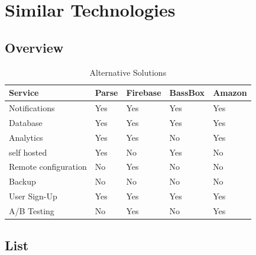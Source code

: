 
\section{Similar Technologies}

\subsection{Overview}

\begin{table}[h]
\centering
\caption{Alternative Solutions}
\label{fig:overview}
\begin{tabular}{|l|l|l|l|l|}
\hline
\cellcolor{green!20}Service &\cellcolor{green!20}Parse &\cellcolor{green!20}Firebase &\cellcolor{green!20}BassBox &\cellcolor{green!20}Amazon \\ \hline
Notifications               & Yes                      & Yes                         & Yes                        & Yes\\ \hline
Database                    & Yes                      & Yes                         & Yes                        & Yes\\ \hline
Analytics                   & Yes                      & Yes                         & No                         & Yes\\ \hline
self hosted                 & Yes                      & No                          & Yes                        & No \\ \hline
Remote configuration        & No                       & Yes                         & No                         & No \\ \hline
Backup                      & No                       & No                          & No                         & No \\ \hline
User Sign-Up                & Yes                      & Yes                         & Yes                        & Yes\\ \hline
A/B Testing                 & No                       & Yes                         & No                         & Yes\\ \hline
\end{tabular}
\end{table}


\subsection{List}

